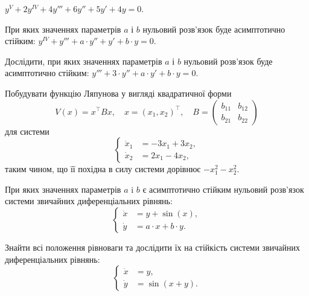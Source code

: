 \begin{problem}
	$y^V + 2 y^{IV} + 4 y''' + 6 y'' + 5 y' + 4 y = 0$.
\end{problem}

\begin{problem}
	При яких значеннях параметрів $a$ і $b$ нульовий розв'язок буде асимптотично стійким: $y^{IV} + y''' + a \cdot y'' + y' + b \cdot y = 0$.
\end{problem}

\begin{problem}
	Дослідити, при яких значеннях параметрів $a$ і $b$ нульовий розв'язок буде асимптотично стійким: $y''' + 3 \cdot y'' + a \cdot y' + b \cdot y = 0$.
\end{problem}

\begin{problem}
	Побудувати функцію Ляпунова у вигляді квадратичної форми
	\[V(x) = x^\intercal B x, \quad x = (x_1, x_2)^\intercal, \quad B = \begin{pmatrix} b_{11} & b_{12} \\ b_{21} & b_{22} \end{pmatrix}\]
	для системи
	\[\left\{ \begin{aligned} \dot x_1 &= - 3 x_1 + 3 x_2, \\ \dot x_2 &= 2 x_1 - 4 x_2, \end{aligned} \right.\]
	таким чином, що її похідна в силу системи дорівнює $-x_1^2 - x_2^2$.
\end{problem}

\begin{problem}
	При яких значеннях параметрів $a$ i $b$ є асимптотично стійким нульовий розв'язок системи звичайних диференціальних рівнянь:
	\[\left\{ \begin{aligned} \dot x &= y + \sin (x), \\ \dot y &= a \cdot x + b \cdot y. \end{aligned} \right.\]
\end{problem}

\begin{problem}
	Знайти всі положення рівноваги та дослідити їх на стійкість системи звичайних диференціальних рівнянь:
	\[\left\{ \begin{aligned} \dot x &= y, \\ \dot y &= \sin (x + y). \end{aligned} \right.\]
\end{problem}
